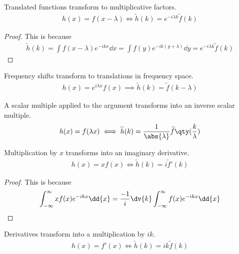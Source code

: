 \begin{proposition}[Translation]
	Translated functions transform to multiplicative factors.
	\begin{align} \label{eq:8.9}
		h(x) = f(x - \lambda) \iff \widetilde h(k) = e^{-i\lambda k} \widetilde f(k)
	\end{align}
\end{proposition}

\begin{proof}
	This is because
	\begin{align*}
		\widetilde h(k) = \int f(x - \lambda) e^{-ikx} \dd{x} = \int f(y) e^{-ik(y + \lambda)} \dd{y} = e^{-i\lambda k} \widetilde f(k)
	\end{align*}
\end{proof}

\begin{proposition}
	Frequency shifts transform to translations in frequency space.
	\begin{align} \label{eq:8.10}
		h(x) = e^{i\lambda x}f(x) \implies \widetilde h(k) = \widetilde f(k - \lambda)
	\end{align}
\end{proposition}

\begin{proposition}[Scaling]
	A scalar multiple applied to the argument transforms into an inverse scalar multiple.
	\begin{align} \label{eq:8.11}
		h(x) = f(\lambda x) \iff \widetilde h(k) = \frac{1}{\abs{\lambda}} \widetilde f\qty(\frac{k}{\lambda})
	\end{align}
\end{proposition}

\begin{proposition}[Multiplication by $x$]
	Multiplication by $x$ transforms into an imaginary derivative.
	\begin{align} \label{eq:8.12}
		h(x) = xf(x) \iff \widetilde h(k) = i\widetilde f'(k)
	\end{align}
\end{proposition}

\begin{proof}
	This is because
	\begin{align*}
		\int_{-\infty}^\infty xf(x) e^{-ikx} \dd{x} = \frac{-1}{i} \dv{k} \int_{-\infty}^\infty f(x) e^{-ikx} \dd{x}
	\end{align*}
\end{proof}

\begin{proposition}[Derivatives]
	Derivatives transform into a multiplication by $ik$.
	\begin{align} \label{eq:8.13}
		h(x) = f'(x) \iff \widetilde h(k) = ik \widetilde f(k)
	\end{align}
\end{proposition}

